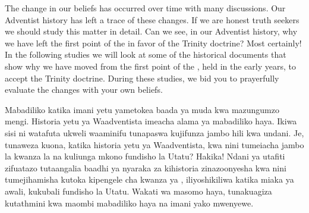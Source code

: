 The change in our beliefs has occurred over time with many discussions. Our Adventist history has left a trace of these changes. If we are honest truth seekers we should study this matter in detail. Can we see, in our Adventist history, why we have left the first point of the  in favor of the Trinity doctrine? Most certainly! In the following studies we will look at some of the historical documents that show why we have moved from the first point of the , held in the early years, to accept the Trinity doctrine. During these studies, we bid you to prayerfully evaluate the changes with your own beliefs.


Mabadiliko katika imani yetu yametokea baada ya muda kwa mazungumzo mengi. Historia yetu ya Waadventista imeacha alama ya mabadiliko haya. Ikiwa sisi ni watafuta ukweli waaminifu tunapaswa kujifunza jambo hili kwa undani. Je, tunaweza kuona, katika historia yetu ya Waadventista, kwa nini tumeiacha jambo la kwanza la  na kuliunga mkono fundisho la Utatu? Hakika! Ndani ya utafiti zifuatazo tutaangalia baadhi ya nyaraka za kihistoria zinazoonyesha kwa nini tumejihamisha kutoka kipengele cha kwanza ya , iliyoshikiliwa katika miaka ya awali, kukubali fundisho la Utatu. Wakati wa masomo haya, tunakuagiza kutathmini kwa maombi mabadiliko haya na imani yako mwenyewe.






